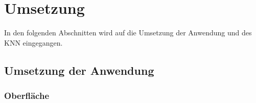 \chapter{Umsetzung}
\label{chapter:Umsetzung}

In den folgenden Abschnitten wird auf die Umsetzung der Anwendung und des KNN eingegangen.

\section{Umsetzung der Anwendung}
\label{section:Umsetzung der Anwendung}

\subsection{Oberfläche}
\label{subsection:Oberfläche}

